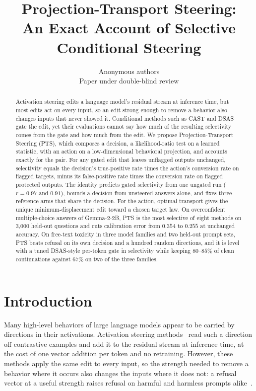 \documentclass{article}
\title{Projection-Transport Steering:\\ An Exact Account of Selective Conditional Steering}
\author{Anonymous authors\\Paper under double-blind review}
\begin{document}
\maketitle

\begin{abstract}
Activation steering edits a language model's residual stream at inference
time, but most edits act on every input, so an edit strong enough to remove a
behavior also changes inputs that never showed it. Conditional methods such as
CAST and DSAS gate the edit, yet their evaluations cannot say how much of the
resulting selectivity comes from the gate and how much from the edit. We
propose Projection-Transport Steering (PTS), which composes a decision, a
likelihood-ratio test on a learned statistic, with an action on a
low-dimensional behavioral projection, and accounts exactly for the pair. For
any gated edit that leaves unflagged outputs unchanged, selectivity equals the
decision's true-positive rate times the action's conversion rate on flagged
targets, minus its false-positive rate times the conversion rate on flagged
protected outputs. The identity predicts gated selectivity from one ungated
run ($r=0.97$ and $0.91$), bounds a decision from unsteered answers alone, and
fixes three reference arms that share the decision. For the action, optimal
transport gives the unique minimum-displacement edit toward a chosen target
law. On overconfident multiple-choice answers of Gemma-2-2B, PTS is the most
selective of eight methods on 3{,}000 held-out questions and cuts calibration
error from $0.354$ to $0.255$ at unchanged accuracy. On free-text toxicity in
three model families and two held-out prompt sets, PTS beats refusal on its
own decision and a hundred random directions, and it is level with a tuned
DSAS-style per-token gate in selectivity while keeping $80$--$85\%$ of clean
continuations against $67\%$ on two of the three families.
\end{abstract}

\section{Introduction}
\label{sec:intro}

Many high-level behaviors of large language models appear to be carried by
directions in their activations. Activation steering
methods~\citep{turner2023actadd,rimsky2024caa,zou2023repe,li2023iti} read such
a direction off contrastive examples and add it to the residual stream at
inference time, at the cost of one vector addition per token and no retraining.
However, these methods apply the same edit to every input, so the strength
needed to remove a behavior where it occurs also changes the inputs where it
does not: a refusal vector at a useful strength raises refusal on harmful and
harmless prompts alike~\citep{arditi2024refusal}.
\end{document}
